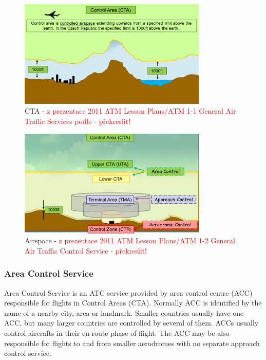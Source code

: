 \begin{figure}[h]
    \centering
    \includegraphics[width=0.8\textwidth]{figures/cta.png}
    \caption{CTA - \textcolor{red}{z prezentace 2011 ATM Lesson Plans/ATM 1-1 General Air Traffic Services podle \cite[Chapter 2.10]{annex11} - překreslit!}}
    \label{fig:cta}
\end{figure}

\begin{figure}[h]
    \centering
    \includegraphics[width=0.8\textwidth]{figures/airspace2.png}
    \caption{Airspace - \textcolor{red}{z prezentace 2011 ATM Lesson Plans/ATM 1-2 General Air Traffic Control Service \cite[Chapter 2.10]{annex11} - překreslit!}}
    \label{fig:airspace2}
\end{figure}

\subsubsection{Area Control Service}
Area Control Service is an ATC service provided by area control centre (ACC) responsible for flights in Control Areas (CTA). Normally ACC is identified by the name of a nearby city, area or landmark. Smaller countries usually have one ACC, but many larger countries are controlled by several of them. ACCs usually control aircrafts in their en-route phase of flight. The ACC may be also responsible for flights to and from smaller aerodromes with no separate approach control service. \cite[Chapter 3.2]{annex11}

